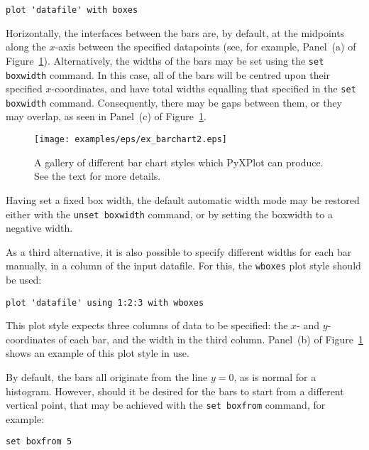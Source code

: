 \begin{verbatim} 
plot 'datafile' with boxes
\end{verbatim}

\noindent Horizontally, the interfaces between the bars are, by default, at the
midpoints along the $x$-axis between the specified datapoints (see, for
example, Panel~(a) of Figure~\ref{fig:ex_barchart2}).  Alternatively, the
widths of the bars may be set using the \texttt{set boxwidth} command. In this
case, all of the bars will be centred upon their specified $x$-coordinates, and
have total widths equalling that specified in the \texttt{set
boxwidth} command.
Consequently, there may be gaps between them, or they may overlap, as seen in
Panel~(c) of Figure~\ref{fig:ex_barchart2}.

\begin{figure}
\begin{center}
\texttt{[image: examples/eps/ex\_barchart2.eps]}
\end{center}
\caption{A gallery of different bar chart styles which PyXPlot can produce. See the text for more details.}
\label{fig:ex_barchart2}
\end{figure}

Having set a fixed box width, the default automatic width mode may be restored
either with the \texttt{unset boxwidth} command, or by setting the boxwidth to
a negative width.

As a third alternative, it is also possible to specify different widths for
each bar manually, in a column of the input datafile. For this, the
\texttt{wboxes} plot style
should be used:

\begin{verbatim} 
plot 'datafile' using 1:2:3 with wboxes
\end{verbatim}

\noindent This plot style expects three columns of data to be specified: the
$x$- and $y$-coordinates of each bar, and the width in the third column.
Panel~(b) of Figure~\ref{fig:ex_barchart2} shows an example of this plot style
in use.

By default, the bars all originate from the line $y=0$, as is normal for a
histogram. However, should it be desired for the bars to start from a different
vertical point, that may be achieved with the \texttt{set boxfrom} command, for
example:

\begin{verbatim} 
set boxfrom 5
\end{verbatim}

